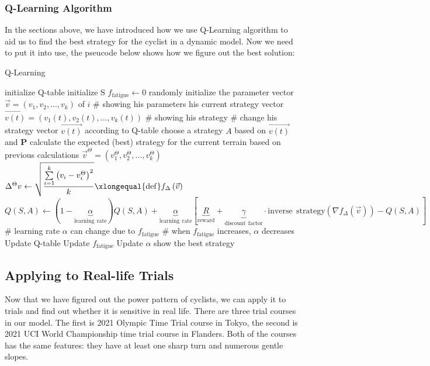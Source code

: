 \documentclass{article}
\begin{document}
			\subsubsection{Q-Learning Algorithm}
			In the sections above, we have introduced how we use Q-Learning algorithm to aid us to find the best strategy for the cyclist in a dynamic model. Now we need to put it into use, the pseucode below shows how we figure out the best solution:
				\begin{algorithm}
					\caption{Q-Learning}
					\begin{algorithmic}
						\STATE initialize Q-table
						\STATE initialize S
						\STATE $f_{\mathrm{fatigue}}\leftarrow 0$
						\STATE randomly initialize the parameter vector $\vec{v}=\left( v_1,v_2,...,v_k \right)$ of $i$ \# showing his parameters
						\STATE his current strategy vector $\vec{v\left(t\right)}=\left( v_1\left(t\right),v_2\left(t\right),...,v_k\left(t\right) \right)$ \# showing his strategy
						\ENDFOR
						\STATE \# change his strategy vector $\vec{v\left(t\right)}$ according to Q-table
						\STATE choose a strategy \textbf{$A$} based on $\vec{v\left(t\right)}$ and \textbf{P}
						\STATE calculate the expected (best) strategy for the current terrain based on previous calculations $\vec{v}^{\Theta}=\left( v_{1}^{\Theta},v_{2}^{\Theta},...,v_{k}^{\Theta} \right) $
						\STATE
						\STATE $\Delta ^{\Theta}v\leftarrow \sqrt{\dfrac{\sum\limits_{i=1}^k{\left( v_i-v_{i}^{\Theta} \right) ^2}}{k}}\xlongequal{\mathrm{def}}f_{\Delta}\left( \vec{v} \right) $
						\STATE
						\STATE $Q(S,A)\gets (1-\underset{\mathrm{learning}\:\:\mathrm{rate}}{\underbrace{\alpha }})Q(S,A)+\underset{\mathrm{learning}\:\:\mathrm{rate}}{\underbrace{\alpha }}[\underset{\mathrm{reward}}{\underbrace{R}}+\underset{\mathrm{discount}\:\:\mathrm{factor}}{\underbrace{\gamma }}\cdot \mathrm{inverse}\:\:\mathrm{strategy}\left( \nabla f_{\Delta}\left( \vec{v} \right) \right) -Q(S,A)]$
						\STATE
						\STATE \# learning rate $\alpha$ can change due to $f_{\mathrm{fatigue}}$
						\STATE \# when $f_{\mathrm{fatigue}}$ increases, $\alpha$ decreases
						\STATE Update Q-table
						\STATE Update $f_{\mathrm{fatigue}}$
						\STATE Update $\alpha$
						\ENDWHILE
						\STATE show the best strategy
					\end{algorithmic}
				\end{algorithm}


		\subsection{Applying to Real-life Trials}
		Now that we have figured out the power pattern of cyclists, we can apply it to trials and find out whether it is sensitive in real life. There are three trial courses in our model. The first is 2021 Olympic Time Trial course in Tokyo\cite{tokyo}, the second is 2021 UCI World Championship time trial course in Flanders\cite{UCI}. Both of the courses has the same features: they have at least one sharp turn and numerous gentle slopes.
\end{document}
